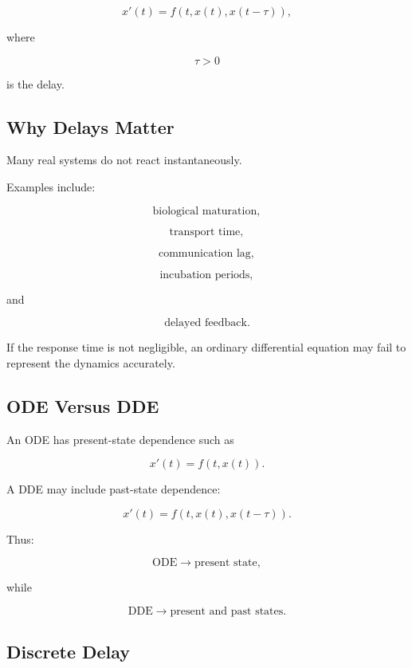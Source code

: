\[
\boxed{
x'(t)
=
f
\left(
t,
x(t),
x(t-\tau)
\right),
}
\]

where

\[
\boxed{
\tau>0
}
\]

is the delay.

\subsection{Why Delays Matter}
\label{subsec:why-delays-matter}

Many real systems do not react instantaneously.

Examples include:

\[
\boxed{
\text{biological maturation},
}
\]

\[
\boxed{
\text{transport time},
}
\]

\[
\boxed{
\text{communication lag},
}
\]

\[
\boxed{
\text{incubation periods},
}
\]

and

\[
\boxed{
\text{delayed feedback}.
}
\]

If the response time is not negligible, an ordinary differential equation
may fail to represent the dynamics accurately.

\subsection{ODE Versus DDE}
\label{subsec:ode-versus-dde}

An ODE has present-state dependence such as

\[
\boxed{
x'(t)
=
f(t,x(t)).
}
\]

A DDE may include past-state dependence:

\[
\boxed{
x'(t)
=
f
\left(
t,
x(t),
x(t-\tau)
\right).
}
\]

Thus:

\[
\boxed{
\text{ODE}
\rightarrow
\text{present state},
}
\]

while

\[
\boxed{
\text{DDE}
\rightarrow
\text{present and past states}.
}
\]

\subsection{Discrete Delay}
\label{subsec:discrete-delay}

